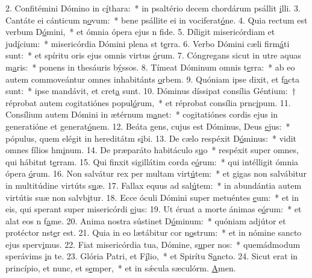 2. Confitémini Dómino in c\uline{í}thara:~* in psaltério decem chordárum psállit \uline{i}lli.
3. Cantáte ei cánticum n\uline{o}vum:~* bene psállite ei in vociferat\uline{ó}ne.
4. Quia rectum est verbum D\uline{ó}mini,~* et ómnia ópera ejus n f\uline{i}de.
5. Díligit misericórdiam et jud\uline{í}cium:~* misericórdia Dómini plena st t\uline{e}rra.
6. Verbo Dómini cæli firm\uline{á}ti sunt:~* et spíritu oris ejus omnis virtus \uline{ó}rum.
7. Cóngregans sicut in utre aquas m\uline{a}ris:~* ponens in thesáuris b\uline{ý}ssos.
8. Tímeat Dóminum omnis t\uline{e}rra:~* ab eo autem commoveántur omnes inhabitánts \uline{o}rbem.
9. Quóniam ipse dixit, et f\uline{a}cta sunt:~* ipse mandávit, et cret\uline{a} sunt.
10. Dóminus díssipat consília Géntium:~† réprobat autem cogitatiónes popul\uline{ó}rum,~* et réprobat consília prnc\uline{i}pum.
11. Consílium autem Dómini in ætérnum m\uline{a}net:~* cogitatiónes cordis ejus in generatióne et generat\uline{ó}nem.
12. Beáta gens, cujus est Dóminus, Deus \uline{e}jus:~* pópulus, quem elégit in hereditátm s\uline{i}bi.
13. De cælo respéxit D\uline{ó}minus:~* vidit omnes fílios hm\uline{i}num.
14. De præparáto habitáculo s\uline{u}o~* respéxit super omnes, qui hábitnt t\uline{e}rram.
15. Qui finxit sigillátim corda e\uline{ó}rum:~* qui intélligit ómnia ópera \uline{ó}rum.
16. Non salvátur rex per multam virt\uline{ú}tem:~* et gigas non salvábitur in multitúdine virtúts s\uline{u}æ.
17. Fallax equus ad sal\uline{ú}tem:~* in abundántia autem virtútis suæ non salvb\uline{i}tur.
18. Ecce óculi Dómini super metuéntes \uline{e}um:~* et in eis, qui sperant super misericórdi \uline{e}jus:
19. Ut éruat a morte ánimas e\uline{ó}rum:~* et alat eos n f\uline{a}me.
20. Anima nostra sústinet D\uline{ó}minum:~* quóniam adjútor et protéctor nst\uline{e}r est.
21. Quia in eo lætábitur cor n\uline{o}strum:~* et in nómine sancto ejus sperv\uline{i}mus.
22. Fiat misericórdia tua, Dómine, s\uline{u}per nos:~* quemádmodum sperávims \uline{i}n te.
23. Glória Patri, et F\uline{í}lio,~* et Spirítu S\uline{a}ncto.
24. Sicut erat in princípio, et nunc, et s\uline{e}mper,~* et in sǽcula sæculórm. \uline{A}men.
